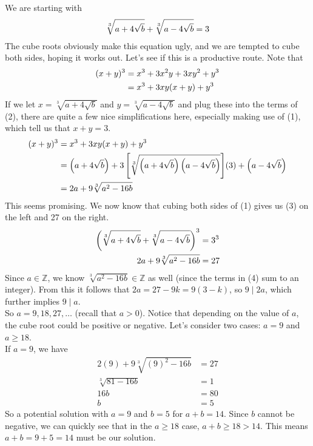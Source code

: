 \documentclass[12pt]{article}
\begin{document}
\begin{solution}[A]
   We are starting with 
   \begin{align} \setcounter{equation}{0}
      \sqrt[3]{a+4\sqrt{b}} + \sqrt[3]{a-4\sqrt{b}} = 3
   \end{align}
   The cube roots obviously make this equation ugly, and we are tempted to cube both sides, hoping it works out. Let's see if this is a productive route. Note that
   \begin{align} 
      (x+y)^3 &= x^3 + 3x^2y + 3xy^2 + y^3 \notag \\
      &= x^3 + 3xy(x+y) + y^3
   \end{align}
   If we let $x=\sqrt[3]{a+4\sqrt{b}}$ and $y=\sqrt[3]{a-4\sqrt{b}}$ and plug these into the terms of (2), there are quite a few nice simplifications here, especially making use of (1), which tell us that $x+y=3$.
   \begin{align}
      (x+y)^3 &= x^3 + 3xy(x+y) + y^3 \notag \\
      &= \left(a+4\sqrt{b}\right) + 3\left[\sqrt[3]{\left(a+4\sqrt{b}\right)\left(a-4\sqrt{b}\right)}\right]\!(3) + \left(a-4\sqrt{b}\right) \notag \\
      &= 2a + 9\sqrt[3]{a^2-16b}
   \end{align}
   This seems promising. We now know that cubing both sides of (1) gives us (3) on the left and 27 on the right.
   \begin{align}
      \left(\sqrt[3]{a+4\sqrt{b}} + \sqrt[3]{a-4\sqrt{b}}\right)^3 &= 3^3 \notag \\
      2a + 9\sqrt[3]{a^2-16b} &= 27
   \end{align}
   Since $a\in\mathbb{Z}$, we know $\sqrt[3]{a^2-16b}\in\mathbb{Z}$ as well (since the terms in (4) sum to an integer). From this it follows that $2a=27-9k=9(3-k)$, so $9\mid2a$, which further implies $9\mid a$.
   \\[5pt]
   So $a=9, 18, 27,\dots$ (recall that $a>0$). Notice that depending on the value of $a$, the cube root could be positive or negative. Let's consider two cases: $a = 9$ and $a \geq 18$.
   \\[5pt]
   If $a = 9$, we have
   \begin{align*}
      2(9) + 9\sqrt[3]{(9)^2-16b} &= 27 \\
      \sqrt[3]{81-16b} &= 1 \\
      16b &= 80 \\
      b &= 5
   \end{align*}
   So a potential solution with $a=9$ and $b=5$ for $a+b=14$. Since $b$ cannot be negative, we can quickly see that in the $a \geq 18$ case, $a+b\geq18>14$. This means $a+b=9+5=\boxed{14}$ must be our solution.
\end{solution}
\end{document}
